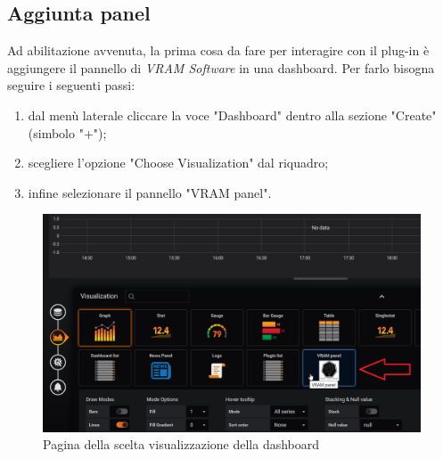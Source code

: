     \subsection{Aggiunta panel}
        Ad abilitazione avvenuta, la prima cosa da fare per interagire con il plug-in è aggiungere il pannello di \textit{VRAM Software} in una dashboard\glo. Per farlo bisogna seguire i seguenti passi:
        \begin{enumerate}
            \item dal menù laterale cliccare la voce "Dashboard" dentro alla sezione "Create" (simbolo "+");
            \item scegliere l'opzione "Choose Visualization" dal riquadro;
            \item infine selezionare il pannello "VRAM panel".
        \end{enumerate}
        \begin{figure}[H]
            \includegraphics[width=\textwidth,height=\textheight,keepaspectratio]{img/aggiunta_plug-in.png}
            \caption{Pagina della scelta visualizzazione della dashboard}
        \end{figure}
